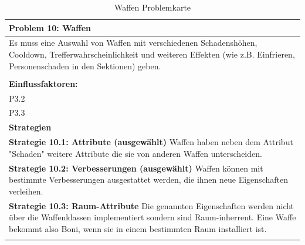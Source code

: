 \documentclass[fontsize=12pt,paper=a4,twoside]{scrartcl}
\begin{document}
\begin{table}[H]
    \centering
    \begin{tabular}{|p{15cm}|}
    \hline
          \textbf{Problem 10: Waffen}  \\ \hline
	Es muss eine Auswahl von Waffen mit verschiedenen Schadenshöhen, Cooldown, Trefferwahrscheinlichkeit und weiteren Effekten (wie z.B. Einfrieren, Personenschaden in den Sektionen) geben. \\
         \\ \hline
          \textbf{Einflussfaktoren: } \\
	P3.2 \\
	P3.3 \\
          \hline
          \textbf{Strategien} \\ \hline
            {}          
           \label{strategie:10.1}     
          \textbf{Strategie 10.1: Attribute  (ausgewählt)} Waffen haben neben dem Attribut "Schaden" weitere Attribute die sie von anderen Waffen unterscheiden.  \\        
  {}          
           \label{strategie:10.2}              
          \textbf{Strategie 10.2: Verbesserungen  (ausgewählt)} Waffen können mit bestimmte Verbesserungen ausgestattet werden, die ihnen neue Eigenschaften verleihen.  \\
	 {}          
           \label{strategie:10.3}     
          \textbf{Strategie 10.3: Raum-Attribute} Die genannten Eigenschaften werden nicht über die Waffenklassen implementiert sondern sind Raum-inherrent. Eine Waffe bekommt also Boni, wenn sie in einem bestimmten Raum installiert ist.  \\ 
	 \\ \hline
    \end{tabular}

    \caption{Waffen Problemkarte}
    \label{tab:ProblemKarte10}
\end{table}
\end{document}
